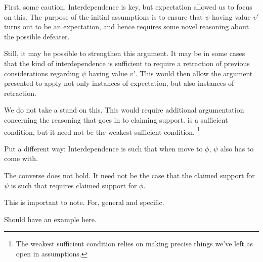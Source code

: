 \begin{note}
  First, some caution.
  Interdependence is key, but expectation allowed us to focus on this.
  The purpose of the initial assumptions is to ensure that \(\psi\) having value \(v'\) turns out to be an expectation, and hence requires some novel reasoning about the possible defeater.

  Still, it may be possible to strengthen this argument.
  It may be in some cases that the kind of interdependence is sufficient to require a retraction of previous considerations regarding \(\psi\) having value \(v'\).
  This would then allow the argument presented to apply not only instances of expectation, but also instances of retraction.

  We do not take a stand on this.
  This would require additional argumentation concerning the reasoning that goes in to claiming support.
  \nI{} is a sufficient condition, but it need not be the weakest sufficient condition.\nolinebreak
  \footnote{
    The weakest sufficient condition relies on making precise things we've left as open in assumptions.
  }
\end{note}

\begin{note}
  Put a different way:
  Interdependence is such that when move to \(\phi\), \(\psi\) also has to come with.
\end{note}

\begin{note}
  The converse does not hold.
  It need not be the case that the claimed support for \(\psi\) is such that requires claimed support for \(\phi\).

  This is important to note.
  For, general and specific.

  Should have an example here.
\end{note}



